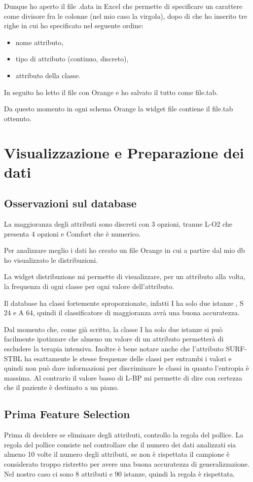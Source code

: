 \documentclass[a4paper, 12p]{report}
\begin{document}
\noindent Dunque ho aperto il file .data in Excel che permette di specificare un carattere come divisore fra le colonne (nel mio caso la virgola), dopo di che ho inserito tre righe in cui ho specificato nel seguente ordine:
\begin{itemize}
\item nome attributo,
\item tipo di attributo (continuo, discreto),
\item attributo della classe. 
\end{itemize}
\noindent In seguito ho letto il file con Orange e ho salvato il tutto come file.tab.

\noindent Da questo momento in ogni schema Orange la widget file contiene il file.tab ottenuto.

\section{Visualizzazione e Preparazione dei dati}

\subsection{Osservazioni sul database}

La maggioranza degli attributi sono discreti con 3 opzioni, tranne L-O2 che presenta 4 opzioni e Comfort che è numerico.

Per analizzare meglio i dati ho creato un  file Orange in cui a partire dal mio db ho visualizzato le distribuzioni.

La widget distribuzione mi permette di visualizzare, per un attributo alla volta, la frequenza di ogni classe per ogni valore dell'attributo. 

Il database ha classi fortemente sproporzionate, infatti I ha solo due istanze , S 24 e A 64, quindi il classificatore di maggioranza avrà una buona accuratezza.

Dal momento che, come già scritto, la classe I ha solo due istanze si può facilmente ipotizzare che almeno un valore di un attributo permetterà di escludere la terapia intensiva. Inoltre è bene notare anche che l'attributo SURF-STBL ha esattamente le stesse frequenze delle classi per entrambi i valori e quindi non può dare informazioni per discriminare le classi in quanto l'entropia è massima. Al contrario il valore basso di L-BP mi permette di dire con certezza che il paziente è destinato a un piano.
\subsection{Prima Feature Selection}
Prima di decidere se eliminare degli attributi, controllo la regola del pollice. La regola del pollice consiste nel controllare che il numero dei dati analizzati sia almeno 10 volte il numero degli attributi, se non è rispettata il campione è considerato troppo ristretto per avere una buona accuratezza di generalizzazione. Nel nostro caso ci sono 8 attributi e 90 istanze, quindi la regola è rispettata.
\end{document}
